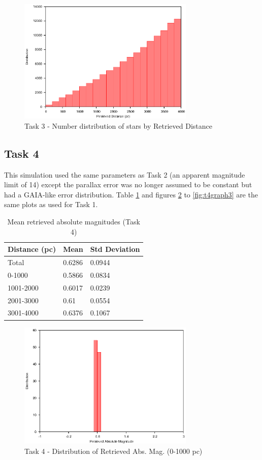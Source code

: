 \documentclass[a4paper,12pt]{article}
\begin{document}
\begin{figure}[H]
\centering
\includegraphics[width=0.75\textwidth]{./Task3/Graph3}
\caption{Task 3 - Number distribution of stars by Retrieved Distance}
\label{fig:t3graph3}
\end{figure}

\newpage
\subsection{Task 4}
This simulation used the same parameters as Task 2 (an apparent magnitude limit of 14) except the parallax error was no longer assumed to be constant but had a GAIA-like error distribution. Table \ref{tab:task4} and figures \ref{fig:t4bin1} to \ref{fig:t4graph3} are the same plots as used for Task 1.
 
\begin{table}[ht]
\centering
\begin{tabular}{|l|l|l|}
\hline
Distance (pc) & Mean & Std Deviation \\
\hline
Total & 0.6286 & 0.0944 \\
0-1000 & 0.5866 & 0.0834 \\
1001-2000 & 0.6017 & 0.0239 \\
2001-3000 & 0.61 & 0.0554 \\
3001-4000 & 0.6376 & 0.1067 \\
\hline
\end{tabular}
\caption{\label{tab:task4}Mean retrieved absolute magnitudes (Task 4)}
\end{table}

\begin{figure}[H]
\centering
\includegraphics[width=0.75\textwidth]{./Task4/Bin1}
\caption{Task 4 -  Distribution of Retrieved Abs. Mag. (0-1000 pc)}
\label{fig:t4bin1}
\end{figure}
\end{document}
